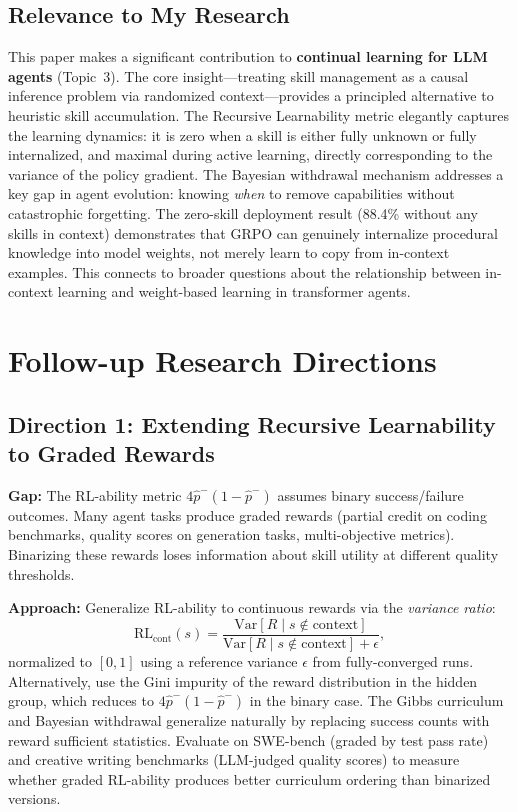 \documentclass[11pt,a4paper]{article}
\begin{document}
\subsection{Relevance to My Research}
This paper makes a significant contribution to \textbf{continual learning for LLM agents} (Topic~3). The core insight---treating skill management as a causal inference problem via randomized context---provides a principled alternative to heuristic skill accumulation. The Recursive Learnability metric elegantly captures the learning dynamics: it is zero when a skill is either fully unknown or fully internalized, and maximal during active learning, directly corresponding to the variance of the policy gradient. The Bayesian withdrawal mechanism addresses a key gap in agent evolution: knowing \emph{when} to remove capabilities without catastrophic forgetting. The zero-skill deployment result (88.4\% without any skills in context) demonstrates that GRPO can genuinely internalize procedural knowledge into model weights, not merely learn to copy from in-context examples. This connects to broader questions about the relationship between in-context learning and weight-based learning in transformer agents.

\section{Follow-up Research Directions}

\subsection{Direction 1: Extending Recursive Learnability to Graded Rewards}
\textbf{Gap:} The RL-ability metric $4\hat{p}^{-}(1-\hat{p}^{-})$ assumes binary success/failure outcomes. Many agent tasks produce graded rewards (partial credit on coding benchmarks, quality scores on generation tasks, multi-objective metrics). Binarizing these rewards loses information about skill utility at different quality thresholds.

\textbf{Approach:} Generalize RL-ability to continuous rewards via the \emph{variance ratio}:
\begin{equation}
  \mathrm{RL}_{\mathrm{cont}}(s) = \frac{\mathrm{Var}[R \mid s \notin \text{context}]}{\mathrm{Var}[R \mid s \notin \text{context}] + \epsilon},
\end{equation}
normalized to $[0, 1]$ using a reference variance $\epsilon$ from fully-converged runs. Alternatively, use the Gini impurity of the reward distribution in the hidden group, which reduces to $4\hat{p}^{-}(1-\hat{p}^{-})$ in the binary case. The Gibbs curriculum and Bayesian withdrawal generalize naturally by replacing success counts with reward sufficient statistics. Evaluate on SWE-bench (graded by test pass rate) and creative writing benchmarks (LLM-judged quality scores) to measure whether graded RL-ability produces better curriculum ordering than binarized versions.
\end{document}

